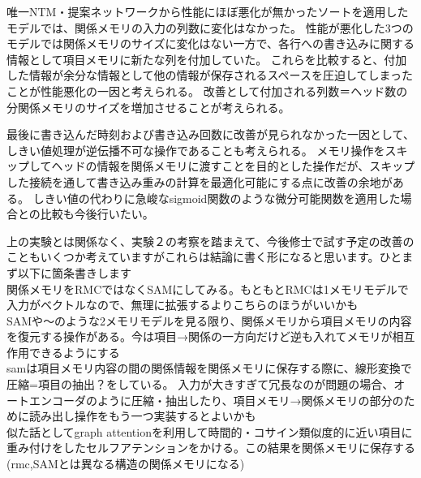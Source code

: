 唯一NTM・提案ネットワークから性能にほぼ悪化が無かったソートを適用したモデルでは、関係メモリの入力の列数に変化はなかった。
性能が悪化した3つのモデルでは関係メモリのサイズに変化はない一方で、各行への書き込みに関する情報として項目メモリに新たな列を付加していた。
これらを比較すると、付加した情報が余分な情報として他の情報が保存されるスペースを圧迫してしまったことが性能悪化の一因と考えられる。
改善として付加される列数＝ヘッド数の分関係メモリのサイズを増加させることが考えられる。

最後に書き込んだ時刻および書き込み回数に改善が見られなかった一因として、しきい値処理が逆伝播不可な操作であることも考えられる。
メモリ操作をスキップしてヘッドの情報を関係メモリに渡すことを目的とした操作だが、スキップした接続を通して書き込み重みの計算を最適化可能にする点に改善の余地がある。
しきい値の代わりに急峻なsigmoid関数のような微分可能関数を適用した場合との比較も今後行いたい。


上の実験とは関係なく、実験２の考察を踏まえて、今後修士で試す予定の改善のこともいくつか考えていますがこれらは結論に書く形になると思います。ひとまず以下に箇条書きします
\\関係メモリをRMCではなくSAMにしてみる。もともとRMCは1メモリモデルで入力がベクトルなので、無理に拡張するよりこちらのほうがいいかも
\\SAMや\cite{working2mem}〜のような2メモリモデルを見る限り、関係メモリから項目メモリの内容を復元する操作がある。今は項目→関係の一方向だけど逆も入れてメモリが相互作用できるようにする
\\samは項目メモリ内容の間の関係情報を関係メモリに保存する際に、線形変換で圧縮=項目の抽出？をしている。
入力が大きすぎて冗長なのが問題の場合、オートエンコーダのように圧縮・抽出したり、項目メモリ→関係メモリの部分のために読み出し操作をもう一つ実装するとよいかも
\\似た話としてgraph attentionを利用して時間的・コサイン類似度的に近い項目に重み付けをしたセルフアテンションをかける。この結果を関係メモリに保存する(rmc,SAMとは異なる構造の関係メモリになる)

